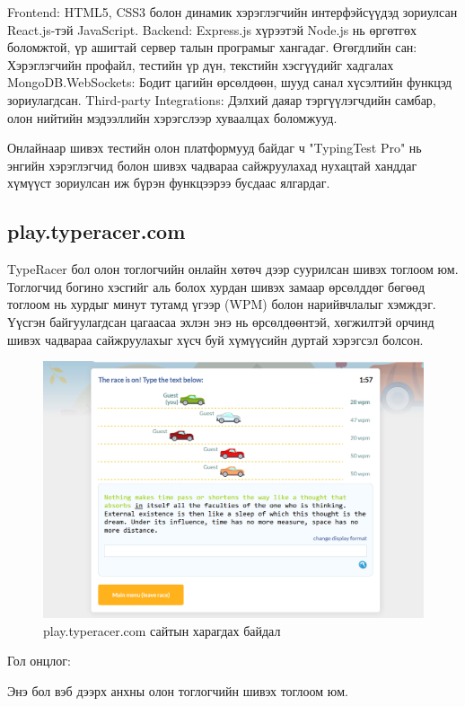 Frontend: HTML5, CSS3 болон динамик хэрэглэгчийн интерфэйсүүдэд зориулсан React.js-тэй JavaScript.
Backend: Express.js хүрээтэй Node.js нь өргөтгөх боломжтой, үр ашигтай сервер талын програмыг хангадаг.
Өгөгдлийн сан: Хэрэглэгчийн профайл, тестийн үр дүн, текстийн хэсгүүдийг хадгалах MongoDB.WebSockets: Бодит цагийн өрсөлдөөн, шууд санал хүсэлтийн функцэд зориулагдсан.
Third-party Integrations: Дэлхий даяар тэргүүлэгчдийн самбар, олон нийтийн мэдээллийн хэрэгслээр хуваалцах боломжууд.

Онлайнаар шивэх тестийн олон платформууд байдаг ч "TypingTest Pro" нь энгийн хэрэглэгчид болон шивэх чадвараа сайжруулахад нухацтай ханддаг хүмүүст зориулсан иж бүрэн функцээрээ бусдаас ялгардаг.

\subsection{play.typeracer.com}

TypeRacer бол олон тоглогчийн онлайн хөтөч дээр суурилсан шивэх тоглоом юм. Тоглогчид богино хэсгийг аль болох хурдан шивэх замаар өрсөлддөг бөгөөд тоглоом нь хурдыг минут тутамд үгээр (WPM) болон нарийвчлалыг хэмждэг. Үүсгэн байгуулагдсан цагаасаа эхлэн энэ нь өрсөлдөөнтэй, хөгжилтэй орчинд шивэх чадвараа сайжруулахыг хүсч буй хүмүүсийн дуртай хэрэгсэл болсон.

\begin{figure}[h]
	\centering
	\includegraphics[width=15cm]{images/TypeRacer.png}
	\caption{play.typeracer.com сайтын харагдах байдал}
	\label{fig:linktree}
\end{figure}

Гол онцлог:

Энэ бол вэб дээрх анхны олон тоглогчийн шивэх тоглоом юм.

